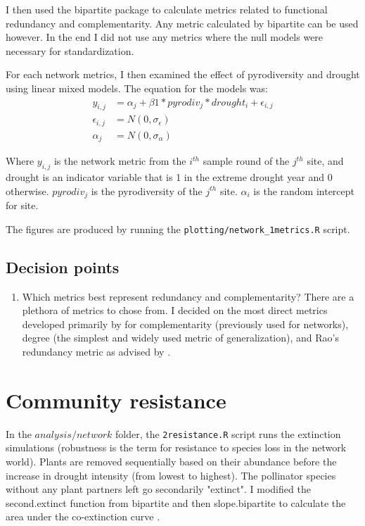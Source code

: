 \documentclass{article}\usepackage[]{graphicx}\usepackage[]{color}
\begin{document}
I then used the bipartite package to calculate metrics related to
functional redundancy and complementarity. Any metric calculated by
bipartite can be used however. In the end I did not use any metrics
where the null models were necessary for standardization.

For each network metrics, I then examined the effect of pyrodiversity
and drought using linear mixed models. The equation for the models
was:
\begin{equation}
\label{equ:metrics}
\begin{aligned}
y_{i,j} & = \alpha_j + \beta1*pyrodiv_j*drought_i + \epsilon_{i,j} \\
\epsilon_{i,j} & = N(0, \sigma_{\epsilon}) \\
\alpha_j & = N(0, \sigma_{\alpha})
\end{aligned}
\end{equation}

Where $y_{i,j}$ is the network metric from the $i^{th}$ sample round
of the $j^{th}$ site, and drought is an indicator variable that is 1
in the extreme drought year and 0 otherwise. $pyrodiv_j$ is the
pyrodiversity of the $j^{th}$ site. $\alpha_i$ is the random
intercept for site.

The figures are produced by running the
\texttt{plotting/network\_1metrics.R} script.


\subsection{Decision points}
\begin{enumerate}
\item Which metrics best represent redundancy and complementarity?
  There are a plethora of metrics to chose from. I decided on the most
  direct metrics developed primarily by
  \citep{devoto2012understanding} for complementarity (previously used
  for networks), degree (the simplest and widely used metric of
  generalization), and Rao's redundancy metric as advised by
  \cite{ricotta2016measuring}.
\end{enumerate}

\section{Community resistance}
\label{sec:comm_resist}

In the $analysis/network$ folder, the \texttt{2resistance.R} script
runs the extinction simulations (robustness is the term for resistance
to species loss in the network world). Plants are removed sequentially
based on their abundance before the increase in drought intensity
(from lowest to highest). The pollinator species without any plant
partners left go secondarily "extinct". I modified the second.extinct
function from bipartite and then slope.bipartite to calculate the area
under the co-extinction curve \citep{Memmott2004}.
\end{document}
